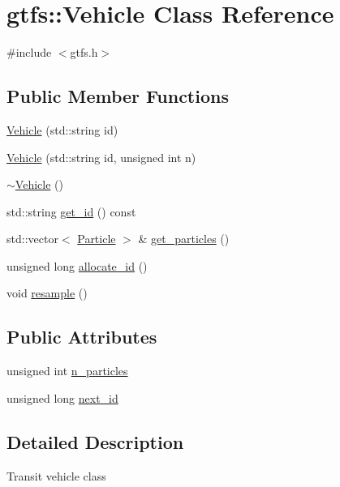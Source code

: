 \hypertarget{classgtfs_1_1Vehicle}{}\section{gtfs\+:\+:Vehicle Class Reference}
\label{classgtfs_1_1Vehicle}


{\ttfamily \#include $<$gtfs.\+h$>$}

\subsection*{Public Member Functions}
\begin{DoxyCompactItemize}
\item 
\hyperlink{classgtfs_1_1Vehicle_ac3f8111a611378f5f8b29f7465e48919}{Vehicle} (std\+::string id)
\item 
\hyperlink{classgtfs_1_1Vehicle_adf892e71483b7f9005846599fd0308e6}{Vehicle} (std\+::string id, unsigned int n)
\item 
\hyperlink{classgtfs_1_1Vehicle_a08c7450dd0df9406f78b30be044d27d8}{$\sim$\+Vehicle} ()
\item 
std\+::string \hyperlink{classgtfs_1_1Vehicle_a1586a271d8c8d7eb61f6f1fac5491e26}{get\+\_\+id} () const 
\item 
std\+::vector$<$ \hyperlink{classgtfs_1_1Particle}{Particle} $>$ \& \hyperlink{classgtfs_1_1Vehicle_a7b12b079c68880f00f532ca25858c368}{get\+\_\+particles} ()
\item 
unsigned long \hyperlink{classgtfs_1_1Vehicle_aa9087e973a9821f384ec47f51bdcedc7}{allocate\+\_\+id} ()
\item 
void \hyperlink{classgtfs_1_1Vehicle_a46ee9775d11595461315be7141359d8a}{resample} ()
\end{DoxyCompactItemize}
\subsection*{Public Attributes}
\begin{DoxyCompactItemize}
\item 
unsigned int \hyperlink{classgtfs_1_1Vehicle_aa21babc8423abf92bbdf5e0748444f44}{n\+\_\+particles}
\item 
unsigned long \hyperlink{classgtfs_1_1Vehicle_aab535dd9953f9650e2adc351965779b1}{next\+\_\+id}
\end{DoxyCompactItemize}


\subsection{Detailed Description}
Transit vehicle class

